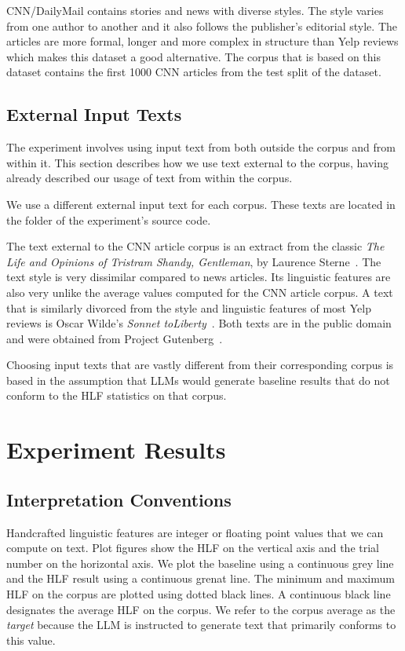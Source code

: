 \documentclass[11pt]{article}
\begin{document}
CNN/DailyMail contains stories and news with diverse styles.
The style varies from one author to another and it also follows the publisher's
editorial style.
The articles are more formal, longer and more complex in structure than Yelp
reviews which makes this dataset a good alternative.
The corpus that is based on this dataset contains the first 1000 CNN articles
from the test split of the dataset.

\subsection{External Input Texts}\label{input-text}

The experiment involves using input text from both outside the corpus and from
within it.
This section describes how we use text external to the corpus, having already
described our usage of text from within the corpus.

We use a different external input text for each corpus.
These texts are located in the
\texttt{}
folder of the experiment's source code.

The text external to the CNN article corpus is an extract from the classic
\textit{The Life and Opinions of Tristram Shandy, Gentleman}, by Laurence
Sterne~\cite{sterne2003life}.
The text style is very dissimilar compared to news articles.
Its linguistic features are also very unlike the average values computed for the
CNN article corpus.
A text that is similarly divorced from the style and linguistic features of most
Yelp reviews is Oscar Wilde's \textit{Sonnet toLiberty}~\cite{wilde1909poems}.
Both texts are in the public domain and were obtained from Project
Gutenberg~\cite{gutenberg}.

Choosing input texts that are vastly different from their corresponding corpus
is based in the assumption that LLMs would generate baseline results that do not
conform to the HLF statistics on that corpus.

\section{Experiment Results}

\subsection{Interpretation Conventions}

Handcrafted linguistic features are integer or floating point values that we
can compute on text.
Plot figures show the HLF on the vertical axis and the trial number on the horizontal
axis.
We plot the baseline using a continuous grey line and the HLF result using a
continuous grenat line.
The minimum and maximum HLF on the corpus are plotted using dotted black lines.
A continuous black line designates the average HLF on the corpus.
We refer to the corpus average as the \textit{target} because the LLM is
instructed to generate text that primarily conforms to this value.
\end{document}
